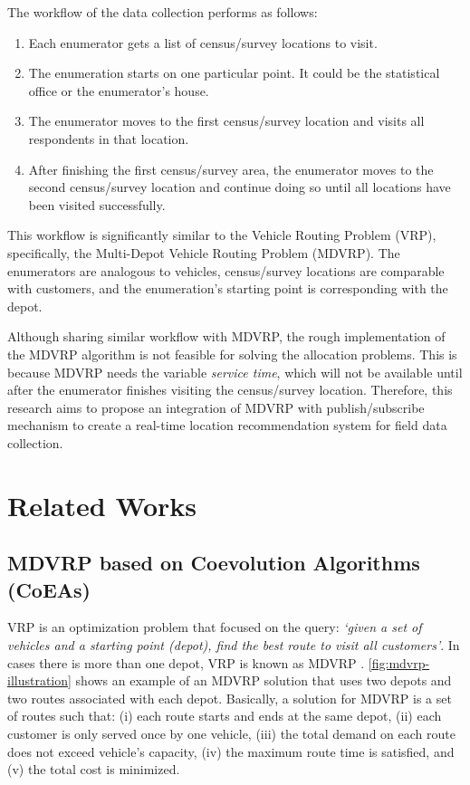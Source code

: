 \documentclass[conference]{IEEEtran}
\begin{document}
The workflow of the data collection performs as follows: 
\begin{enumerate}
	\item Each enumerator gets a list of census/survey locations to visit. 
	\item The enumeration starts on one particular point. It could be the statistical office or the enumerator's house. 
	\item The enumerator moves to the first census/survey location and visits all respondents in that location. 
	\item After finishing the first census/survey area, the enumerator moves to the second census/survey location and continue doing so until all locations have been visited successfully.
\end{enumerate}
This workflow is significantly similar to the Vehicle Routing Problem (VRP), specifically, the Multi-Depot Vehicle Routing Problem (MDVRP). The enumerators are analogous to vehicles, census/survey locations are comparable with customers, and the enumeration's starting point is corresponding with the depot. 

Although sharing similar workflow with MDVRP, the rough implementation of the MDVRP algorithm is not feasible for solving the allocation problems. This is because MDVRP needs the variable \textit{service time}, which will not be available until after the enumerator finishes visiting the census/survey location. Therefore, this research aims to propose an integration of MDVRP with publish/subscribe mechanism to create a real-time location recommendation system for field data collection. 


\section{Related Works}
\label{sec:related-works}

\subsection{MDVRP based on Coevolution Algorithms (CoEAs)}
\label{ssec:evolution-algorithms}
VRP is an optimization problem that focused on the query: \textit{`given a set of vehicles and a starting point (depot), find the best route to visit all customers'}. In cases there is more than one depot, VRP is known as MDVRP \cite{montoya-torres_literature_2015}. \autoref{fig:mdvrp-illustration} shows an example of an MDVRP solution that uses two depots and two routes associated with each depot. Basically, a solution for MDVRP is a set of routes such that: (i) each route starts and ends at the same depot, (ii) each customer is only served once by one vehicle, (iii) the total demand on each route does not exceed vehicle's capacity, (iv) the maximum route time is satisfied, and (v) the total cost is minimized.
\end{document}
